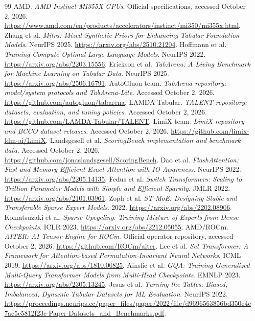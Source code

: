 \documentclass[11pt]{article}
\begin{document}
\begin{thebibliography}{99}
 AMD. \emph{AMD Instinct MI355X GPUs}. Official specifications, accessed October 2, 2026. \url{https://www.amd.com/en/products/accelerators/instinct/mi350/mi355x.html}.
 Zhang et al. \emph{Mitra: Mixed Synthetic Priors for Enhancing Tabular Foundation Models}. NeurIPS 2025. \url{https://arxiv.org/abs/2510.21204}.
 Hoffmann et al. \emph{Training Compute-Optimal Large Language Models}. NeurIPS 2022. \url{https://arxiv.org/abs/2203.15556}.
 Erickson et al. \emph{TabArena: A Living Benchmark for Machine Learning on Tabular Data}. NeurIPS 2025. \url{https://arxiv.org/abs/2506.16791}.
 AutoGluon team. \emph{TabArena repository: model/system protocols and TabArena-Lite}. Accessed October 2, 2026. \url{https://github.com/autogluon/tabarena}.
 LAMDA-Tabular. \emph{TALENT repository: datasets, evaluation, and tuning policies}. Accessed October 2, 2026. \url{https://github.com/LAMDA-Tabular/TALENT}.
 LimiX team. \emph{LimiX repository and BCCO dataset releases}. Accessed October 2, 2026. \url{https://github.com/limix-ldm-ai/LimiX}.
 Landsgesell et al. \emph{ScoringBench implementation and benchmark data}. Accessed October 2, 2026. \url{https://github.com/jonaslandsgesell/ScoringBench}.
 Dao et al. \emph{FlashAttention: Fast and Memory-Efficient Exact Attention with IO-Awareness}. NeurIPS 2022. \url{https://arxiv.org/abs/2205.14135}.
 Fedus et al. \emph{Switch Transformers: Scaling to Trillion Parameter Models with Simple and Efficient Sparsity}. JMLR 2022. \url{https://arxiv.org/abs/2101.03961}.
 Zoph et al. \emph{ST-MoE: Designing Stable and Transferable Sparse Expert Models}. 2022. \url{https://arxiv.org/abs/2202.08906}.
 Komatsuzaki et al. \emph{Sparse Upcycling: Training Mixture-of-Experts from Dense Checkpoints}. ICLR 2023. \url{https://arxiv.org/abs/2212.05055}.
 AMD/ROCm. \emph{AITER: AI Tensor Engine for ROCm}. Official operator repository, accessed October 2, 2026. \url{https://github.com/ROCm/aiter}.
 Lee et al. \emph{Set Transformer: A Framework for Attention-based Permutation-Invariant Neural Networks}. ICML 2019. \url{https://arxiv.org/abs/1810.00825}.
 Ainslie et al. \emph{GQA: Training Generalized Multi-Query Transformer Models from Multi-Head Checkpoints}. EMNLP 2023. \url{https://arxiv.org/abs/2305.13245}.
 Jesus et al. \emph{Turning the Tables: Biased, Imbalanced, Dynamic Tabular Datasets for ML Evaluation}. NeurIPS 2022. \url{https://proceedings.neurips.cc/paper_files/paper/2022/file/d9696563856bd350e4e7ac5e5812f23c-Paper-Datasets_and_Benchmarks.pdf}.

\end{thebibliography}
\end{document}

